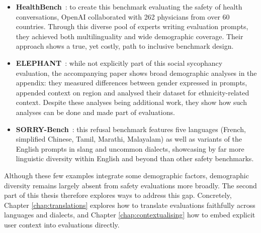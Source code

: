 \begin{itemize}
    \item \textbf{HealthBench}~\cite{arora2025healthbench-7eb}: to create this benchmark evaluating the safety of health conversations, OpenAI collaborated with 262 physicians from over 60 countries. Through this diverse pool of experts writing evaluation prompts, they achieved both multilinguality and wide demographic coverage. Their approach shows a true, yet costly, path to inclusive benchmark design.
    \item \textbf{ELEPHANT}~\cite{cheng2025social-928}: while not explicitly part of this social sycophancy evaluation, the accompanying paper shows broad demographic analyses in the appendix: they measured differences between gender expressed in prompts, appended context on region and analysed their dataset for ethnicity-related context. Despite these analyses being additional work, they show how such analyses can be done and made part of evaluations. 
    \item \textbf{SORRY-Bench}~\cite{xie2025sorrybench}: this refusal benchmark features five languages (French, simplified Chinese, Tamil, Marathi, Malayalam) as well as variants of the English prompts in slang and uncommon dialects, showcasing by far more linguistic diversity within English and beyond than other safety benchmarks.  
\end{itemize}

Although these few examples integrate some demographic factors, demographic
diversity remains largely absent from safety evaluations more broadly. The
second part of this thesis therefore explores ways to address this gap. Concretely, Chapter \ref{chap:translations} explores how to translate evaluations faithfully across languages and dialects, and Chapter \ref{chap:contextualising} how to embed explicit user context into evaluations directly.